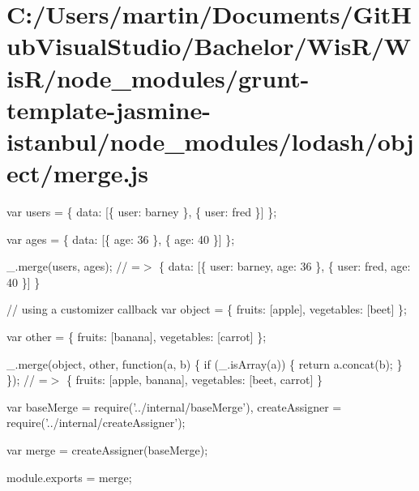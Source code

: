 \hypertarget{_c_1_2_users_2martin_2_documents_2_git_hub_visual_studio_2_bachelor_2_wis_r_2_wis_r_2node_modulecb4db7444c470be3223ba35735193956}{}\section{C\+:/\+Users/martin/\+Documents/\+Git\+Hub\+Visual\+Studio/\+Bachelor/\+Wis\+R/\+Wis\+R/node\+\_\+modules/grunt-\/template-\/jasmine-\/istanbul/node\+\_\+modules/lodash/object/merge.\+js}
var users = \{ \textquotesingle{}data\textquotesingle{}\+: \mbox{[}\{ \textquotesingle{}user\textquotesingle{}\+: \textquotesingle{}barney\textquotesingle{} \}, \{ \textquotesingle{}user\textquotesingle{}\+: \textquotesingle{}fred\textquotesingle{} \}\mbox{]} \};

var ages = \{ \textquotesingle{}data\textquotesingle{}\+: \mbox{[}\{ \textquotesingle{}age\textquotesingle{}\+: 36 \}, \{ \textquotesingle{}age\textquotesingle{}\+: 40 \}\mbox{]} \};

\+\_\+.\+merge(users, ages); // =$>$ \{ \textquotesingle{}data\textquotesingle{}\+: \mbox{[}\{ \textquotesingle{}user\textquotesingle{}\+: \textquotesingle{}barney\textquotesingle{}, \textquotesingle{}age\textquotesingle{}\+: 36 \}, \{ \textquotesingle{}user\textquotesingle{}\+: \textquotesingle{}fred\textquotesingle{}, \textquotesingle{}age\textquotesingle{}\+: 40 \}\mbox{]} \}

// using a customizer callback var object = \{ \textquotesingle{}fruits\textquotesingle{}\+: \mbox{[}\textquotesingle{}apple\textquotesingle{}\mbox{]}, \textquotesingle{}vegetables\textquotesingle{}\+: \mbox{[}\textquotesingle{}beet\textquotesingle{}\mbox{]} \};

var other = \{ \textquotesingle{}fruits\textquotesingle{}\+: \mbox{[}\textquotesingle{}banana\textquotesingle{}\mbox{]}, \textquotesingle{}vegetables\textquotesingle{}\+: \mbox{[}\textquotesingle{}carrot\textquotesingle{}\mbox{]} \};

\+\_\+.\+merge(object, other, function(a, b) \{ if (\+\_\+.\+is\+Array(a)) \{ return a.\+concat(b); \} \}); // =$>$ \{ \textquotesingle{}fruits\textquotesingle{}\+: \mbox{[}\textquotesingle{}apple\textquotesingle{}, \textquotesingle{}banana\textquotesingle{}\mbox{]}, \textquotesingle{}vegetables\textquotesingle{}\+: \mbox{[}\textquotesingle{}beet\textquotesingle{}, \textquotesingle{}carrot\textquotesingle{}\mbox{]} \}


\begin{DoxyCodeInclude}
var baseMerge = require(\textcolor{stringliteral}{'../internal/baseMerge'}),
    createAssigner = require(\textcolor{stringliteral}{'../internal/createAssigner'});

var merge = createAssigner(baseMerge);

module.exports = merge;
\end{DoxyCodeInclude}
 